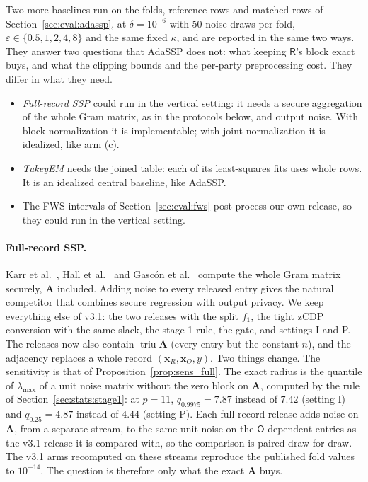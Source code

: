 \documentclass[11pt]{article}
\theoremstyle{definition}
\theoremstyle{plain}
\newcommand{\bx}{\mathbf{x}}
\newcommand{\bA}{\mathbf{A}}
\newcommand{\Party}[1]{\textsf{#1}}
\newcommand{\Rp}{\Party{R}}
\newcommand{\Op}{\Party{O}}
\DeclareMathOperator{\triu}{triu}
\begin{document}
Two more baselines run on the folds, reference rows and matched rows of Section~\ref{sec:eval:adassp}, at $\delta = 10^{-6}$ with 50 noise draws per fold, $\varepsilon \in \{0.5, 1, 2, 4, 8\}$ and the same fixed $\kappa$, and are reported in the same two ways. They answer two questions that AdaSSP does not: what keeping $\Rp$'s block exact buys, and what the clipping bounds and the per-party preprocessing cost. They differ in what they need.
\begin{itemize}[noitemsep]
  \item \emph{Full-record SSP} could run in the vertical setting: it needs a secure aggregation of the whole Gram matrix, as in the protocols below, and output noise. With block normalization it is implementable; with joint normalization it is idealized, like arm (c).
  \item \emph{TukeyEM} needs the joined table: each of its least-squares fits uses whole rows. It is an idealized central baseline, like AdaSSP.
  \item The FWS intervals of Section~\ref{sec:eval:fws} post-process our own release, so they could run in the vertical setting.
\end{itemize}

\paragraph{Full-record SSP.} Karr et al.~\cite{karr2009privacy}, Hall et al.~\cite{hall2011secure} and Gasc\'on et al.~\cite{gascon2017privacy} compute the whole Gram matrix securely, $\bA$ included. Adding noise to every released entry gives the natural competitor that combines secure regression with output privacy. We keep everything else of v3.1: the two releases with the split $f_1$, the tight zCDP conversion with the same slack, the stage-1 rule, the gate, and settings I and P. The releases now also contain $\triu\bA$ (every entry but the constant $n$), and the adjacency replaces a whole record $(\bx_R, \bx_O, y)$. Two things change. The sensitivity is that of Proposition~\ref{prop:sens_full}. The exact radius is the quantile of $\lambda_{\max}$ of a unit noise matrix without the zero block on $\bA$, computed by the rule of Section~\ref{sec:stats:stage1}: at $p = 11$, $q_{0.9975} = 7.87$ instead of $7.42$ (setting I) and $q_{0.25} = 4.87$ instead of $4.44$ (setting P). Each full-record release adds noise on $\bA$, from a separate stream, to the same unit noise on the $\Op$-dependent entries as the v3.1 release it is compared with, so the comparison is paired draw for draw. The v3.1 arms recomputed on these streams reproduce the published fold values to $10^{-14}$. The question is therefore only what the exact $\bA$ buys.
\end{document}

